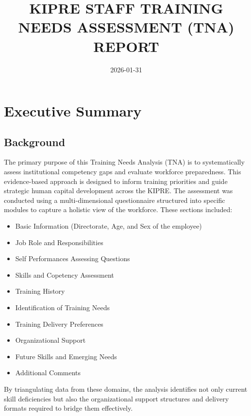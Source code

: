 \documentclass[
]{article}
\title{KIPRE STAFF TRAINING NEEDS ASSESSMENT (TNA) REPORT}
\author{}
\date{\vspace{-2.5em}2026-01-31}
\providecommand{\tightlist}{%
  \setlength{\itemsep}{0pt}\setlength{\parskip}{0pt}}
\begin{document}
\maketitle


\section*{Executive Summary}

\newpage

\subsection{Background}\label{background}

The primary purpose of this Training Needs Analysis (TNA) is to
systematically assess institutional competency gaps and evaluate
workforce preparedness. This evidence-based approach is designed to
inform training priorities and guide strategic human capital development
across the KIPRE. The assessment was conducted using a multi-dimensional
questionnaire structured into specific modules to capture a holistic
view of the workforce. These sections included:

\begin{itemize}
\tightlist
\item
  Basic Information (Directorate, Age, and Sex of the employee)
\item
  Job Role and Responsibilities
\item
  Self Performances Assessing Questions
\item
  Skills and Copetency Assessment
\item
  Training History
\item
  Identification of Training Needs
\item
  Training Delivery Preferences
\item
  Organizational Support
\item
  Future Skills and Emerging Needs
\item
  Additional Comments
\end{itemize}

By triangulating data from these domains, the analysis identifies not
only current skill deficiencies but also the organizational support
structures and delivery formats required to bridge them effectively.
\end{document}
